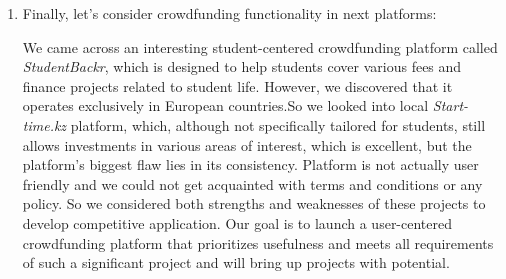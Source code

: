 \begin{enumerate}
  \item Finally, let’s consider crowdfunding functionality in next platforms:

We came across an interesting student-centered crowdfunding platform called \textit{StudentBackr}, which is designed to help students cover various fees and finance projects related to student life. However, we discovered that it operates exclusively in European countries.So we looked into local \textit{Start-time.kz} \cite{starttime} platform, which, although not specifically tailored for students, still allows investments in various areas of interest, which is excellent, but the platform's biggest flaw lies in its consistency. Platform is not actually user friendly and we could not get acquainted with terms and conditions or any policy. So we considered both strengths and weaknesses of these projects to develop competitive application. Our goal is to launch a user-centered crowdfunding platform that prioritizes usefulness and meets all requirements of such a significant project and will bring up projects with potential.
\end{enumerate}